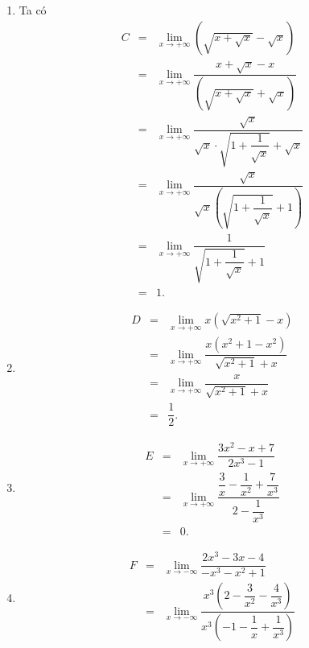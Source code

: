 \begin{ex}
{\begin{enumerate}
\begin{eqnarray*}
				B &=& \displaystyle\lim_{x \to +\infty} \dfrac{x + \sqrt{x^2 + 2}}{\sqrt[3]{8x^3 + x^2 + 1}} \\ 
				&=& \displaystyle\lim_{x \to +\infty} \dfrac{x\left(1 + \sqrt{1 + \dfrac{2}{x^2}}\right)}{x  \cdot \sqrt[3]{8 + \dfrac{1}{x} + \dfrac{1}{x^3}}}\\
				&=&  1.
			\end{eqnarray*}
			 \item Ta có
			\begin{eqnarray*}
				C  &=& \displaystyle\lim_{x\to +\infty}\left(\sqrt{x+\sqrt{x}}-\sqrt{x}\right) \\
				&=& \displaystyle\lim_{x\to  +\infty}\dfrac{x+\sqrt{x}-x}{\left(\sqrt{x+\sqrt{x}}+\sqrt{x}\right)} \\
				&=& \displaystyle\lim_{x\to +\infty}\dfrac{\sqrt{x}}{\sqrt{x}\cdot\sqrt{1+\dfrac{1}{\sqrt{x}}}+\sqrt{x}}  \\
				&=&  \displaystyle\lim_{x\to +\infty}\dfrac{\sqrt{x}}{\sqrt{x}\left(\sqrt{1+\dfrac{1}{\sqrt{x}}}+1\right)}\\
				&=& \displaystyle\lim_{x\to  +\infty}\dfrac{1}{\sqrt{1+\dfrac{1}{\sqrt{x}}}+1}\\
				&=&1. 
			\end{eqnarray*}
			\item 
			\begin{eqnarray*}
				D &=& \displaystyle\lim_{x \to +\infty} x\left( \sqrt{x^2 +  1} - x \right) \\
				&=& \displaystyle\lim_{x \to +\infty}  \dfrac{x\left(x^2 + 1 - x^2\right)}{\sqrt{x^2 + 1} + x}\\
				&=& \displaystyle\lim_{x \to +\infty}  \dfrac{x}{\sqrt{x^2 + 1} + x} \\
				&=& \dfrac{1}{2}. 
			\end{eqnarray*}
			\item 
			\begin{eqnarray*}
				 E &=& \displaystyle\lim_{x \to +\infty} \dfrac{3x^2-x+7}{2x^3-1}\\
				&=& \displaystyle\lim_{x \to +\infty} \dfrac{\dfrac{3}{x} - \dfrac{1}{x^2} + \dfrac{7}{x^3}}{2 -  \dfrac{1}{x^3}}\\
				 &=& 0.
			\end{eqnarray*}
			 \item
			\begin{eqnarray*}
				F &=& \displaystyle\lim_{x \to -\infty} \dfrac{2x^3 - 3x -  4}{-x^3 - x^2 + 1} \\
				&=& \displaystyle\lim_{x \to -\infty} \dfrac{x^3 \left(2 - \dfrac{3}{x^2} - \dfrac{4}{x^3}\right)}{x^3  \left(-1 - \dfrac{1}{x} + \dfrac{1}{x^3}\right)}\\

\end{eqnarray*}
\end{enumerate}}
\end{ex}
